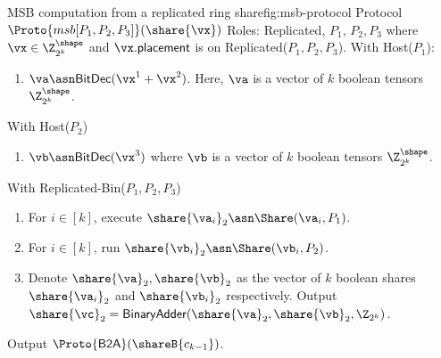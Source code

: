 \begin{Boxfig}{MSB computation from a replicated ring share}{fig:msb-protocol}
  {Protocol $\Proto{msb[P_1, P_2, P_3]}(\share{\vx})$}
  Roles: Replicated, $P_1$, $P_2, P_3$ where $\vx \in \Z_{2^k}^\shape$ and
  $\vx.\mathsf{placement}$ is on Replicated($P_1, P_2, P_3$). \newline
  With Host($P_1$):
  \begin{enumerate}
    \item $\va \asn \textsf{BitDec}(\vx^1 + \vx^2)$. Here, $\va$ is a vector of $k$ boolean tensors $\Z_{2^k}^\shape$.
  \end{enumerate}
  With Host($P_2$)
  \begin{enumerate}
    \item $\vb \asn \textsf{BitDec}(\vx^3)$ where $\vb$ is a vector of $k$ boolean tensors $\Z_{2^k}^\shape$.
  \end{enumerate}
  With Replicated-Bin($P_1, P_2, P_3$)
  \begin{enumerate}
    \item For $i \in [k]$, execute $\share{\va_i}_2 \asn \Share(\va_i, P_1)$.
    \item For $i \in [k]$, run $\share{\vb_i}_2 \asn \Share(\vb_i,
    P_2)$.  
    \item Denote $\share{\va}_2,
    \share{\vb}_2$ as the vector of $k$ boolean shares
    $\share{\va_i}_2$ and $\share{\vb_i}_2$ respectively. Output $\share{\vc}_2 = \textsf{BinaryAdder}(\share{\va}_2, \share{\vb}_2, \Z_{2^k})$.
  \end{enumerate}
  Output $\Proto{\textsf{B2A}}(\shareB{c_{k-1}})$.

\end{Boxfig}

